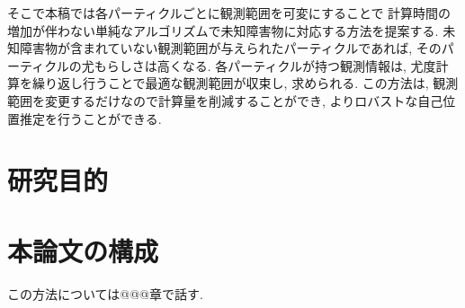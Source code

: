 そこで本稿では各パーティクルごとに観測範囲を可変にすることで
計算時間の増加が伴わない単純なアルゴリズムで未知障害物に対応する方法を提案する. 
未知障害物が含まれていない観測範囲が与えられたパーティクルであれば, 
そのパーティクルの尤もらしさは高くなる. 
各パーティクルが持つ観測情報は, 尤度計算を繰り返し行うことで最適な観測範囲が収束し, 求められる. 
この方法は, 観測範囲を変更するだけなので計算量を削減することができ, 
よりロバストな自己位置推定を行うことができる. 

\section{研究目的}



\section{本論文の構成}
この方法については@@@章で話す. 

